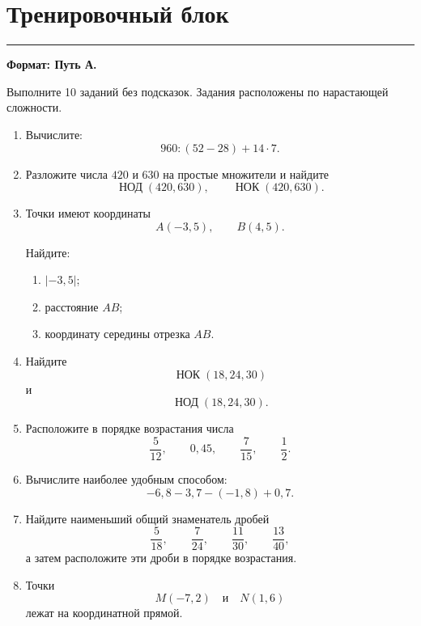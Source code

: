 \documentclass[a4paper,12pt]{article}
\newcommand{\sectionline}{
  \par
  \vspace{-0.35em}
  {\color{accent}\rule{\linewidth}{0.5pt}}
  \vspace{0.55em}
}
\newcommand{\nodmath}{
  \mathop{\mbox{НОД}}\nolimits
}
\newcommand{\nokmath}{
  \mathop{\mbox{НОК}}\nolimits
}
\begin{document}
\clearpage

\section*{Тренировочный блок}
\sectionline

\textbf{Формат: Путь А.}

Выполните 10 заданий без подсказок.
Задания расположены по нарастающей сложности.

\begin{enumerate}[label=\textbf{\arabic*.},leftmargin=*]


  \item
  Вычислите:
  \[
  960:(52-28)+14\cdot 7.
  \]

  \item
  Разложите числа $420$ и $630$
  на простые множители и найдите
  \[
  \nodmath(420,630),
  \qquad
  \nokmath(420,630).
  \]

  \item
  Точки имеют координаты
  \[
  A(-3,5),
  \qquad
  B(4,5).
  \]

  Найдите:

  \begin{enumerate}[label=\arabic*)]
    \item $|-3,5|$;
    \item расстояние $AB$;
    \item координату середины отрезка $AB$.
  \end{enumerate}


  \item
  Найдите
  \[
  \nokmath(18,24,30)
  \]
  и
  \[
  \nodmath(18,24,30).
  \]

  \item
  Расположите в порядке возрастания числа
  \[
  \frac{5}{12},
  \qquad
  0,45,
  \qquad
  \frac{7}{15},
  \qquad
  \frac12.
  \]

  \item
  Вычислите наиболее удобным способом:
  \[
  -6,8-3,7-(-1,8)+0,7.
  \]

  \item
  Найдите наименьший общий знаменатель дробей
  \[
  \frac{5}{18},
  \qquad
  \frac{7}{24},
  \qquad
  \frac{11}{30},
  \qquad
  \frac{13}{40},
  \]
  а затем расположите эти дроби
  в порядке возрастания.

  \item
  Точки
  \[
  M(-7,2)
  \quad\text{и}\quad
  N(1,6)
  \]
  лежат на координатной прямой.


\end{enumerate}
\end{document}
